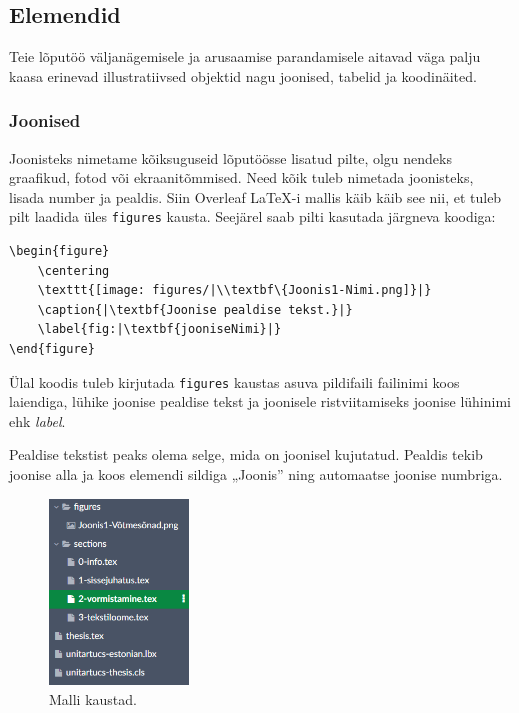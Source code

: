 \subsection{Elemendid}
Teie lõputöö väljanägemisele ja arusaamise parandamisele aitavad väga palju kaasa erinevad illustratiivsed objektid nagu joonised, tabelid ja koodinäited.

\subsubsection{Joonised}
Joonisteks nimetame kõiksuguseid lõputöösse lisatud pilte, olgu nendeks graafikud, fotod või ekraanitõmmised. Need kõik tuleb nimetada joonisteks, lisada number ja pealdis. Siin Overleaf LaTeX-i mallis käib käib see nii, et tuleb pilt laadida üles \verb|figures| kausta. Seejärel saab pilti kasutada järgneva koodiga:

\begin{verbatim}
\begin{figure}
    \centering
    \texttt{[image: figures/|\\textbf\{Joonis1-Nimi.png]}|}
    \caption{|\textbf{Joonise pealdise tekst.}|}
    \label{fig:|\textbf{jooniseNimi}|}
\end{figure}
\end{verbatim}

Ülal koodis tuleb kirjutada \verb|figures| kaustas asuva pildifaili failinimi koos laiendiga, lühike joonise pealdise tekst ja joonisele ristviitamiseks joonise lühinimi ehk \emph{label}.

Pealdise tekstist peaks olema selge, mida on joonisel kujutatud. Pealdis tekib joonise alla ja koos elemendi sildiga „Joonis” ning automaatse joonise numbriga.

\begin{figure}
    \centering
    \includegraphics[width=0.33\textwidth]{figures/Joonis2-FiguresKaust.png}
    \caption{Malli kaustad.}
    \label{fig:folders}
\end{figure}

